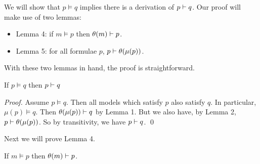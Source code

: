 We will show that $p \models q$ implies there is a derivation of $p
\vdash q$.  Our proof will make use of two lemmas:
\begin{itemize}
\item
Lemma 4: if $m \models p$ then $\theta(m) \vdash p$.
\item
Lemma 5: for all formulae $p$, $p \vdash \theta(\mu(p))$.
\end{itemize}
With these two lemmas in hand, the proof is straightforward.
\begin{theorem}
If $p \models q$ then $p \vdash q$
\end{theorem}
\begin{proof}
Assume $p \models q$. 
Then all models which satisfy $p$ also satisfy $q$.
In particular, $\mu(p) \models q$.
Then $\theta(\mu(p)) \vdash q$ by Lemma 1.
But we also have, by Lemma 2, $p \vdash \theta(\mu(p)) $.
So by transitivity, we have $p \vdash q$.
\qed
\end{proof}
Next we will prove Lemma 4.
\begin{lemma}
If $m \models p$ then $\theta(m) \vdash p$.
\end{lemma}
